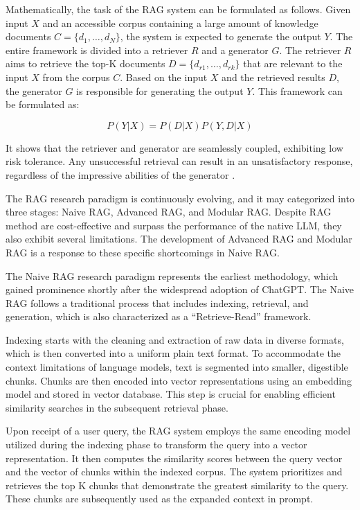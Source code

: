 Mathematically, the task of the RAG system can be formulated as follows.  Given input \(X\) and an accessible corpus containing a large amount of knowledge documents \(C = \{d_1, \ldots, d_N\}\), the system is expected to generate the output \(Y\). The entire framework is divided into a retriever \(R\)
and a generator \(G\). The retriever \(R\) aims to retrieve
the top-K documents \(D = \{d_{r1}, \ldots, d_{rk}\}\) that are
relevant to the input \(X\) from the corpus \(C\). Based on the input \(X\) and the retrieved results \(D\), the generator \(G\) is responsible for generating the output \(Y\). This framework can be formulated as:

\[P(Y|X) = P(D|X)P(Y, D|X)\]

It shows that the retriever and generator are seamlessly coupled, exhibiting low risk tolerance. Any unsuccessful retrieval can result in an unsatisfactory response, regardless of the impressive abilities of the generator \cite{Yan.29Jan2024}.

The RAG research paradigm is continuously evolving, and it may categorized into three stages: Naive RAG, Advanced RAG, and Modular RAG. Despite RAG method are cost-effective and surpass the performance of the native LLM, they also exhibit several limitations. The development of Advanced RAG and Modular RAG is a response to these specific shortcomings in Naive RAG. \cite{Gao.18Dec2023}

The Naive RAG research paradigm represents the earliest methodology, which gained prominence shortly after the widespread adoption of ChatGPT. The Naive RAG follows a traditional process that includes indexing, retrieval, and generation, which is also characterized as a “Retrieve-Read” framework. 

Indexing starts with the cleaning and extraction of raw data in diverse formats, which is then converted into a uniform plain text format. To accommodate the context limitations of language models, text is segmented into smaller, digestible chunks. Chunks are then encoded into vector representations using an embedding model and stored in vector database. This step is crucial for enabling efficient similarity searches in the subsequent retrieval phase. 

Upon receipt of a user query, the RAG system employs the same encoding model utilized during the indexing phase to transform the query into a vector representation. It then computes the similarity scores between the query vector and the vector of chunks within the indexed corpus. The system prioritizes and retrieves the top K chunks that demonstrate the greatest similarity to the query. These chunks are subsequently used as the expanded context in prompt. 

